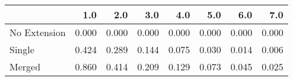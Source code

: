 \begin{tabular}{lrrrrrrr}
\toprule
{} &   1.0 &   2.0 &   3.0 &   4.0 &   5.0 &   6.0 &   7.0 \\
\midrule
No Extension & 0.000 & 0.000 & 0.000 & 0.000 & 0.000 & 0.000 & 0.000 \\
Single       & 0.424 & 0.289 & 0.144 & 0.075 & 0.030 & 0.014 & 0.006 \\
Merged       & 0.860 & 0.414 & 0.209 & 0.129 & 0.073 & 0.045 & 0.025 \\
\bottomrule
\end{tabular}
